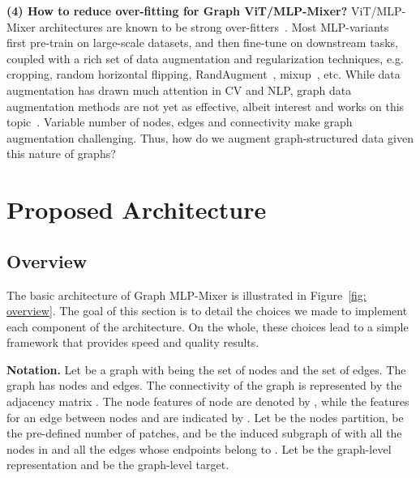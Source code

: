 \documentclass{article}
\begin{document}
\textbf{(4) How to reduce over-fitting for Graph ViT/MLP-Mixer?} 
ViT/MLP-Mixer architectures are known to be strong over-fitters~\citep{liu2021gmlp}. Most MLP-variants~\citep{tolstikhin2021mlp, touvron2021resmlp, wang2022dynamixer} first pre-train on large-scale datasets, and then fine-tune on downstream tasks, coupled with a rich set of data augmentation and regularization techniques, e.g. cropping, random horizontal flipping, RandAugment~\citep{cubuk2020randaugment}, mixup~\citep{zhang2017mixup}, etc. While data augmentation has drawn much attention in CV and NLP, graph data augmentation methods are not yet as effective, albeit interest and works on this topic~\citep{zhao2021data}. Variable number of nodes, edges and connectivity make graph augmentation challenging. Thus, how do we augment graph-structured data given this nature of graphs? 




\section{Proposed Architecture}\label{sec: archi}

\subsection{Overview}\label{sec: overview}

The basic architecture of Graph MLP-Mixer is illustrated in Figure~\ref{fig: overview}. The goal of this section is to detail the choices we made to implement each component of the architecture. On the whole, these choices lead to a simple framework that provides speed and quality results.

\textbf{Notation.}  Let  be a graph with  being the set of nodes and  the set of edges. The graph has  nodes and  edges. The connectivity of the graph is represented by the adjacency matrix . The node features of node  are denoted by , while the features for an edge between nodes  and  are indicated by .  Let  be the nodes partition,  be the pre-defined number of patches, and  be the induced subgraph of  with all the nodes in  and all the edges whose endpoints belong to . Let  be the graph-level representation and  be the graph-level target.
\end{document}
